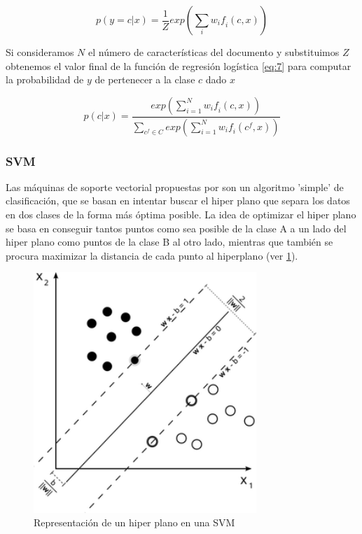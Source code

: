 \begin{equation}\label{eq:7}
\mathit{p(y = c|x) = \frac{1}{Z}exp(\sum_{i}w_if_i(c,x))}
\end{equation}

Si consideramos \(N\) el número de características del documento y substituimos \(Z\) obtenemos el valor final de la función de regresión logística \ref{eq:7} para computar la probabilidad de \(y\) de pertenecer a la clase \(c\) dado \(x\)

\begin{equation}
\mathit{p(c|x)=\frac{exp(\sum_{i=1}^{N}w_if_i(c,x))}{\sum_{c^f \in C}exp(\sum_{i=1}^{N}w_if_i(c^f,x))}}
\end{equation}

\subsubsection{SVM}\label{svm}

Las máquinas de soporte vectorial propuestas por \cite{svmbib} son un algoritmo 'simple' de clasificación, que se basan en intentar buscar el hiper plano que separa los datos en dos clases de la forma más óptima posible. La idea de optimizar el hiper plano se basa en conseguir tantos puntos como sea posible de la clase A a un lado del hiper plano como puntos de la clase B al otro lado, mientras que también se procura maximizar la distancia de cada punto al hiperplano (ver \ref{svmfigure}).

\begin{figure}[!ht]
	\centering
	\includegraphics[width=0.75\textwidth]{imaxes/svm.png}
	\caption{Representación de un hiper plano en una SVM}
	\label{svmfigure}
\end{figure}

